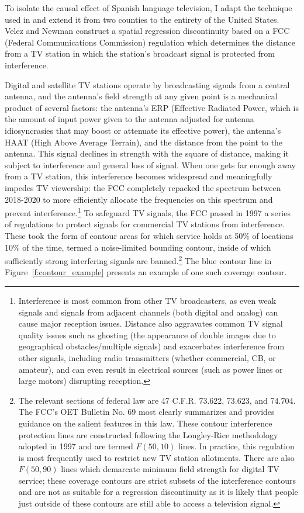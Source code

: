 \documentclass[11pt]{article}
\begin{document}
To isolate the causal effect of Spanish language television, I adapt the technique used in \cite{velez_tuning_2019}  and extend it from two counties to the entirety of the United States. Velez and Newman construct a spatial regression discontinuity based on a FCC (Federal Communications Commission) regulation which determines the distance from a TV station in which the station's broadcast signal is protected from interference.

Digital and satellite TV stations operate by broadcasting signals from a central antenna, and the antenna's field strength at any given point is a mechanical product of several factors: the antenna's ERP (Effective Radiated Power, which is the amount of input power given to the antenna adjusted for antenna idiosyncrasies that may boost or attenuate its effective power), the antenna's HAAT (High Above Average Terrain), and the distance from the point to the antenna. This signal declines in strength with the square of distance, making it subject to interference and general loss of signal. When one gets far enough away from a TV station, this interference becomes widespread and meaningfully impedes TV viewership: the FCC completely repacked the spectrum between 2018-2020 to more efficiently allocate the frequencies on this spectrum and prevent interference.\footnote{ Interference is most common from other TV broadcasters, as even weak signals and signals from adjacent channels (both digital and analog) can cause major reception issues. Distance also aggravates common TV signal quality issues such as ghosting (the appearance of double images due to geographical obstacles/multiple signals) and exacerbates interference from other signals, including radio transmitters (whether commercial, CB, or amateur), and can even result in electrical sources (such as power lines or large motors) disrupting reception.} To safeguard TV signals, the FCC passed in 1997 a series of regulations to protect signals for commercial TV stations from interference. These took the form of contour areas for which service holds at 50\% of locations 10\% of the time, termed a noise-limited bounding contour, inside of which sufficiently strong interfering signals are banned.\footnote{ The relevant sections of federal law are 47 C.F.R. 73.622, 73.623, and 74.704. The FCC's OET Bulletin No. 69 most clearly summarizes and provides guidance on the salient features in this law. These contour interference protection lines are constructed following the Longley-Rice methodology adopted in 1997 and are termed $F(50,10)$ lines. In practice, this regulation is most frequently used to restrict new TV station allotments. There are also $F(50,90)$ lines which demarcate minimum field strength for digital TV service; these coverage contours are strict subsets of the interference contours and are not as suitable for a regression discontinuity as it is likely that people just outside of these contours are still able to access a television signal.} The blue contour line in Figure~\ref{f:contour_example} presents an example of one such coverage contour.
\end{document}
